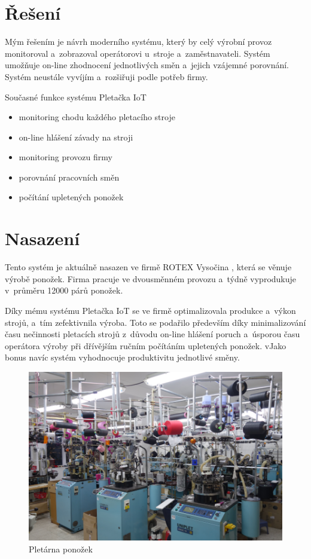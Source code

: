\section{Řešení}
Mým řešením je návrh moderního systému, který by celý výrobní provoz monitoroval a~zobrazoval operátorovi u~stroje a~zaměstnavateli.
Systém umožňuje on-line zhodnocení jednotlivých směn a~jejich vzájemné porovnání.
Systém neustále vyvíjím a~rozšiřuji podle potřeb firmy.

Současné funkce systému Pletačka IoT
\begin{itemize}
    \item monitoring chodu každého pletacího stroje
    \item on-line hlášení závady na stroji
    \item monitoring provozu firmy
    \item porovnání pracovních směn
    \item počítání upletených ponožek
\end{itemize}



\section{Nasazení}
Tento systém je aktuálně nasazen ve firmě ROTEX Vysočina \cite{ROTEX}, která se věnuje výrobě ponožek. 
Firma pracuje ve dvousměnném provozu a~týdně vyprodukuje v~průměru 12000 párů ponožek. 

Díky mému systému Pletačka IoT se ve firmě optimalizovala produkce a výkon strojů, a tím zefektivnila výroba. 
Toto se podařilo především díky minimalizování času nečinnosti pletacích strojů z důvodu on-line hlášení poruch a~úsporou času operátora výroby při dřívějším ručním počítáním upletených ponožek. 
vJako bonus navíc systém vyhodnocuje produktivitu jednotlivé směny.

\begin{figure}[htbp]
    \centering
    \includegraphics[width=\textwidth]{img/pletarna.png}
    \caption{Pletárna ponožek}
    \label{fig:Pletarna}
\end{figure}



\newpage